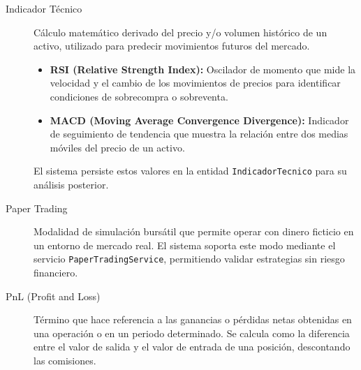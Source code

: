 \documentclass[12pt, letterpaper]{article}
\begin{document}
\begin{description}
    \item[Indicador Técnico] Cálculo matemático derivado del precio y/o volumen histórico de un activo, utilizado para predecir movimientos futuros del mercado.
    \begin{itemize}
        \item \textbf{RSI (Relative Strength Index):} Oscilador de momento que mide la velocidad y el cambio de los movimientos de precios para identificar condiciones de sobrecompra o sobreventa.
        \item \textbf{MACD (Moving Average Convergence Divergence):} Indicador de seguimiento de tendencia que muestra la relación entre dos medias móviles del precio de un activo.
    \end{itemize}
    El sistema persiste estos valores en la entidad \texttt{IndicadorTecnico} para su análisis posterior.
    
    \item[Paper Trading] Modalidad de simulación bursátil que permite operar con dinero ficticio en un entorno de mercado real. El sistema soporta este modo mediante el servicio \texttt{PaperTradingService}, permitiendo validar estrategias sin riesgo financiero.

    \item[PnL (Profit and Loss)] Término que hace referencia a las ganancias o pérdidas netas obtenidas en una operación o en un periodo determinado. Se calcula como la diferencia entre el valor de salida y el valor de entrada de una posición, descontando las comisiones.
\end{description}

\newpage
\printbibliography[heading=bibintoc, title={Referencias Bibliográficas}]
\end{document}

